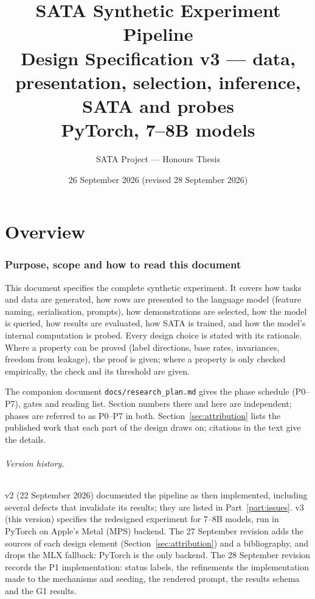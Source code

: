 \documentclass[11pt,a4paper]{article}
\title{SATA Synthetic Experiment Pipeline\\[4pt]
       \large Design Specification v3 --- data, presentation, selection, inference, SATA and probes\\[2pt]
       \normalsize PyTorch, 7--8B models}
\author{SATA Project --- Honours Thesis}
\date{26 September 2026 (revised 28 September 2026)}
\newcommand{\1}{\mathbf{1}}
\theoremstyle{plain}
\theoremstyle{definition}
\theoremstyle{remark}
\begin{document}
\maketitle
\tableofcontents
\newpage

\part{Overview}

\section{Purpose, scope and how to read this document}

This document specifies the complete synthetic experiment. It covers how
tasks and data are generated, how rows are presented to the language model
(feature naming, serialisation, prompts), how demonstrations are selected,
how the model is queried, how results are evaluated, how SATA is trained,
and how the model's internal computation is probed. Every design choice is
stated with its rationale. Where a property can be proved (label directions,
base rates, invariances, freedom from leakage), the proof is given; where a
property is only checked empirically, the check and its threshold are given.

The companion document \texttt{docs/research\_plan.md} gives the phase
schedule (P0--P7), gates and reading list. Section numbers there and here are
independent; phases are referred to as P0--P7 in both.
Section~\ref{sec:attribution} lists the published work that each part of the
design draws on; citations in the text give the details.

\paragraph{Version history.}
v2 (22 September 2026) documented the pipeline as then implemented,
including several defects that invalidate its results; they are listed in
Part~\ref{part:issues}. v3 (this version) specifies the redesigned
experiment for 7--8B models, run in PyTorch on Apple's Metal (MPS) backend.
The 27 September revision adds the sources of each design element
(Section~\ref{sec:attribution}) and a bibliography, and drops the MLX
fallback: PyTorch is the only backend. The 28 September revision records the P1
implementation: status labels, the refinements the implementation made to
the mechanisms and seeding, the rendered prompt, the results schema and the
G1 results.
\end{document}
